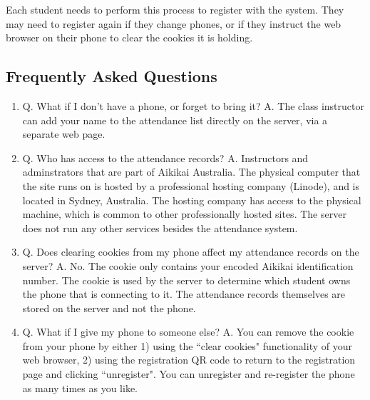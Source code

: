 \documentclass{report}
\begin{document}
Each student needs to perform this process to register with the system.
They may need to register again if they change phones, or if they instruct the
web browser on their phone to clear the cookies it is holding.



\subsection*{Frequently Asked Questions}
\begin{enumerate}
\item Q. What if I don't have a phone, or forget to bring it?
      A. The class instructor can add your name to the attendance list
         directly on the server, via a separate web page.

\item Q. Who has access to the attendance records?
      A. Instructors and adminstrators that are part of Aikikai Australia.
         The physical computer that the site runs on is hosted by a professional hosting
         company (Linode), and is located in Sydney, Australia. The hosting company
         has access to the physical machine, which is common to other professionally
         hosted sites. The server does not run any other services besides the
         attendance system.

\item Q. Does clearing cookies from my phone affect my attendance records on the server?
      A. No. The cookie only contains your encoded Aikikai identification number.
         The cookie is used by the server to determine which student owns the phone
         that is connecting to it. The attendance records themselves are stored
         on the server and not the phone.

\item Q. What if I give my phone to someone else?
      A. You can remove the cookie from your phone by either 1) using the ``clear cookies"
         functionality of your web browser, 2) using the registration QR code to return
         to the registration page and clicking ``unregister". You can unregister
         and re-register the phone as many times as you like.
\end{enumerate}
\end{document}
